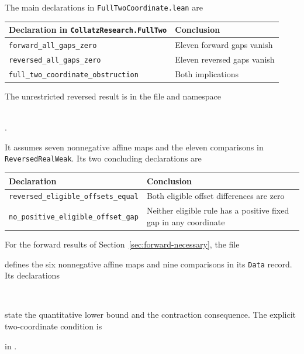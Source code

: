 \documentclass[11pt,a4paper]{article}
\newcommand{\code}[1]{\texttt{#1}}
\begin{document}
The main declarations in \code{FullTwoCoordinate.lean} are
\begin{center}
\small
\begin{tabular}{@{}ll@{}}
\toprule
Declaration in \code{CollatzResearch.FullTwo} & Conclusion\\
\midrule
\code{forward\_all\_gaps\_zero} & Eleven forward gaps vanish\\
\code{reversed\_all\_gaps\_zero} & Eleven reversed gaps vanish\\
\code{full\_two\_coordinate\_obstruction} & Both implications\\
\bottomrule
\end{tabular}
\end{center}
The unrestricted reversed result is in the file and namespace
\begin{center}\small
{}\\
.
\end{center}
It assumes seven nonnegative affine maps and the eleven comparisons in
\code{ReversedRealWeak}. Its two concluding declarations are
\begin{center}\small
\begin{tabular}{@{}lp{64mm}@{}}
\toprule
Declaration & Conclusion\\
\midrule
\code{reversed\_eligible\_offsets\_equal} & Both eligible offset differences are zero\\
\code{no\_positive\_eligible\_offset\_gap} & Neither eligible rule has a positive fixed gap in any coordinate\\
\bottomrule
\end{tabular}
\end{center}

For the forward results of Section~\ref{sec:forward-necessary}, the file
\begin{center}\small
{}
\end{center}
defines the six nonnegative affine maps and nine comparisons in its
\code{Data} record. Its declarations
\begin{center}\small
{}\\
\end{center}
state the quantitative lower bound and the contraction consequence.
The explicit two-coordinate condition is
\begin{center}\small
{}
\end{center}
in .
\end{document}
